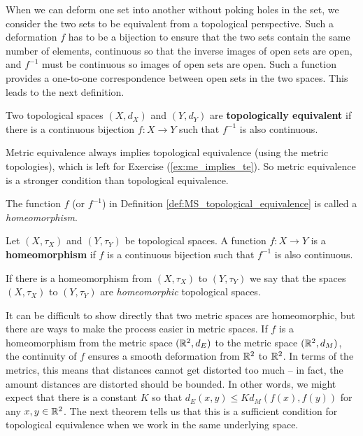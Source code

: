  
When we can deform one set into another without poking holes in the set, we consider the two sets to be equivalent from a topological perspective. Such a deformation $f$ has to be a bijection to ensure that the two sets contain the same number of elements, continuous so that the inverse images of open sets are open, and $f^{-1}$ must be continuous so images of open sets are open. Such a function provides a one-to-one correspondence between open sets in the two spaces. This leads to the next definition.

\begin{definition} \label{def:MS_topological_equivalence} Two topological spaces $(X,d_X)$ and $(Y,d_Y)$ are \textbf{topologically equivalent} if there is a continuous bijection $f : X \to Y$ such that $f^{-1}$ is also continuous.  
\end{definition}

Metric equivalence always implies topological equivalence (using the metric topologies), which is left for Exercise (\ref{ex:me_implies_te}). So metric equivalence is a stronger condition than topological equivalence.

The function $f$ (or $f^{-1}$) in Definition \ref{def:MS_topological_equivalence} is called a \emph{homeomorphism}.

\begin{definition} \label{def:Homeomorphism} Let $(X,\tau_X)$ and $(Y,\tau_Y)$ be topological spaces. A function $f: X \to Y$ is a \textbf{homeomorphism} if $f$ is a continuous bijection such that $f^{-1}$ is also continuous.  
\end{definition}

If there is a homeomorphism from $(X,\tau_X)$ to $(Y,\tau_Y)$ we say that the spaces $(X,\tau_X)$ to $(Y,\tau_Y)$ are \emph{homeomorphic} topological spaces. 

It can be difficult to show directly that two metric spaces are homeomorphic, but there are ways to make the process easier in metric spaces. If $f$ is a homeomorphism from the metric space $(\mathbb{R}^2, d_E)$ to the metric space $(\mathbb{R}^2, d_M)$, the continuity of $f$ ensures a smooth deformation from $\mathbb{R}^2$ to $\mathbb{R}^2$. In terms of the metrics, this means that distances cannot get distorted too much -- in fact, the amount distances are distorted should be bounded. In other words, we might expect that there is a constant $K$ so that $d_E(x,y) \leq K d_M(f(x), f(y))$ for any $x, y \in \mathbb{R}^2$. The next theorem tells us that this is a sufficient condition for topological equivalence when we work in the same underlying space. 

